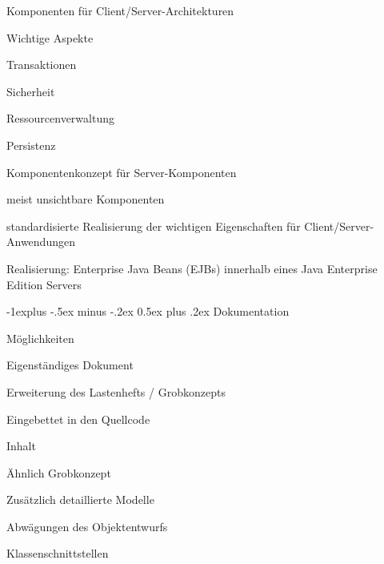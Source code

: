 \documentclass[a4paper]{article}
\makeatletter
\renewcommand{\subsection}{\@startsection{subsection}{2}{0mm}%
                                {-1explus -.5ex minus -.2ex}%
                                {0.5ex plus .2ex}%
                                {\normalfont\normalsize\bfseries}}
\makeatother
\begin{document}
\begin{multicols}{3}
  Komponenten für Client/Server-Architekturen
  \begin{itemize*}
    \item Wichtige Aspekte
    \begin{itemize*}
      \item Transaktionen
      \item Sicherheit
      \item Ressourcenverwaltung
      \item Persistenz
    \end{itemize*}
    \item Komponentenkonzept für Server-Komponenten
    \begin{itemize*}
      \item meist unsichtbare Komponenten
      \item standardisierte Realisierung der wichtigen Eigenschaften für Client/Server-Anwendungen
      \item Realisierung: Enterprise Java Beans (EJBs) innerhalb eines Java Enterprise Edition Servers
    \end{itemize*}
  \end{itemize*}

  \subsection{Dokumentation}
  \begin{itemize*}
    \item Möglichkeiten
    \begin{itemize*}
      \item Eigenständiges Dokument
      \item Erweiterung des Lastenhefts / Grobkonzepts
      \item Eingebettet in den Quellcode
    \end{itemize*}
    \item Inhalt
    \begin{itemize*}
      \item Ähnlich Grobkonzept
      \item Zusätzlich detaillierte Modelle
      \item Abwägungen des Objektentwurfs
      \item Klassenschnittstellen
    \end{itemize*}
  \end{itemize*}

  \newpage

\end{multicols}
\end{document}
